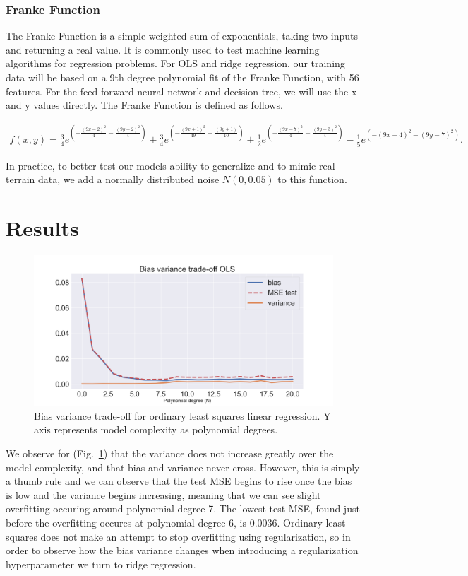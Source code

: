 \documentclass[onecolumn,10pt,cleanfoot]{asme2ej}
\begin{document}
\subsubsection{Franke Function}

The Franke Function is a simple weighted sum of exponentials, taking two inputs and returning a real value. It is commonly used to test machine learning algorithms for regression problems. For OLS and ridge regression, our training data will be based on a 9th degree polynomial fit of the Franke Function, with 56 features. For the feed forward neural network and decision tree, we will use the x and y values directly. The Franke Function is defined as follows.


\begin{multline}
f(x,y) = \frac{3}{4}e^{\left(-\frac{(9x-2)^2}{4}-\frac{(9y-2)^2}{4}\right)} +  \frac{3}{4}e^{\left(-\frac{(9x+1)^2}{49}-\frac{(9y+1)}{10}\right)} +
\frac{1}{2}e^{\left(-\frac{(9x-7)^2}{4}-\frac{(9y-3)^2}{4}\right)} - 
\frac{1}{5}e^{\left(-(9x-4)^2-(9y-7)^2\right)}.
\end{multline}

In practice, to better test our models ability to generalize and to mimic real terrain data, we add a normally distributed noise $N(0,0.05)$ to this function.

\section{Results}

\begin{figure}[H]
\centerline{\includegraphics[width=5in]{figs/BV_OLS.png}}
\caption{Bias variance trade-off for ordinary least squares linear regression. Y axis represents model complexity as polynomial degrees.}
\label{OLS}
\end{figure}

We observe for (Fig.~\ref{OLS}) that the variance does not increase greatly over the model complexity, and that bias and variance never cross. However, this is simply a thumb rule and we can observe that the test MSE begins to rise once the bias is low and the variance begins increasing, meaning that we can see slight overfitting occuring around polynomial degree 7. The lowest test MSE, found just before the overfitting occures at polynomial degree 6, is 0.0036. Ordinary least squares does not make an attempt to stop overfitting using regularization, so in order to observe how the bias variance changes when introducing a regularization hyperparameter we turn to ridge regression.
\end{document}
